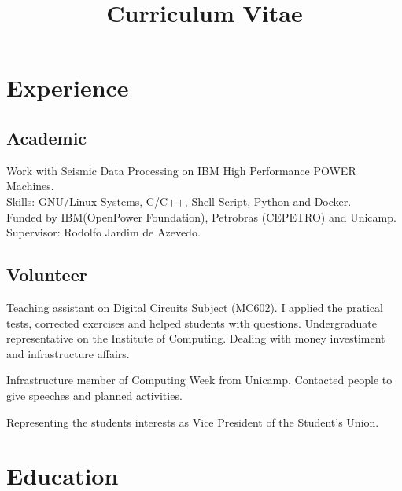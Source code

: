 \documentclass[10pt, a4paper, roman]{moderncv} %
\title{Curriculum Vitae}
\begin{document}
\makecvtitle %

\section{Experience}

\subsection{Academic}
{
    Work with Seismic Data Processing on IBM High Performance POWER Machines.\\ 
    Skills: GNU/Linux Systems, C/C++, Shell Script, Python and Docker.\\ 
    Funded by IBM(OpenPower Foundation), Petrobras (CEPETRO) and Unicamp.\\
    Supervisor: Rodolfo Jardim de Azevedo.
}

\bigskip

\subsection{Volunteer}
{
    Teaching assistant on Digital Circuits Subject (MC602). I applied the pratical tests, corrected exercises
    and helped students with questions.
}
{ 
    Undergraduate representative on the Institute of Computing. Dealing with money investiment and infrastructure 
    affairs.
}

{
    Infrastructure member of Computing Week from Unicamp. Contacted people to give speeches and planned activities.
}


{
    Representing the students interests as Vice President of the Student's Union.
}

\section{Education}

\end{document}

